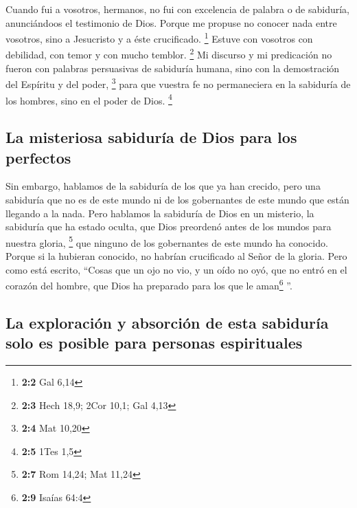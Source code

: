 \begin{paracol}{2}
 Cuando fui a vosotros, hermanos, no fui con excelencia de
palabra o de sabiduría, anunciándoos el testimonio de Dios.
 Porque me propuse no conocer nada entre vosotros, sino a
Jesucristo y a éste crucificado. \footnote{\textbf{2:2} Gal 6,14}
 Estuve con vosotros con debilidad, con temor y con mucho
temblor. \footnote{\textbf{2:3} Hech 18,9; 2Cor 10,1; Gal 4,13}
 Mi discurso y mi predicación no fueron con palabras
persuasivas de sabiduría humana, sino con la demostración del Espíritu y
del poder, \footnote{\textbf{2:4} Mat 10,20}  para que
vuestra fe no permaneciera en la sabiduría de los hombres, sino en el
poder de Dios. \footnote{\textbf{2:5} 1Tes 1,5}

\hypertarget{la-misteriosa-sabiduruxeda-de-dios-para-los-perfectos}{%
\subsection{La misteriosa sabiduría de Dios para los
perfectos}\label{la-misteriosa-sabiduruxeda-de-dios-para-los-perfectos}}

 Sin embargo, hablamos de la sabiduría de los que ya han
crecido, pero una sabiduría que no es de este mundo ni de los
gobernantes de este mundo que están llegando a la nada. 
Pero hablamos la sabiduría de Dios en un misterio, la sabiduría que ha
estado oculta, que Dios preordenó antes de los mundos para nuestra
gloria, \footnote{\textbf{2:7} Rom 14,24; Mat 11,24}  que
ninguno de los gobernantes de este mundo ha conocido. Porque si la
hubieran conocido, no habrían crucificado al Señor de la gloria.
 Pero como está escrito, ``Cosas que un ojo no vio, y un
oído no oyó, que no entró en el corazón del hombre, que Dios ha
preparado para los que le aman\footnote{\textbf{2:9} Isaías 64:4} ''.

\hypertarget{la-exploraciuxf3n-y-absorciuxf3n-de-esta-sabiduruxeda-solo-es-posible-para-personas-espirituales}{%
\subsection{La exploración y absorción de esta sabiduría solo es posible
para personas
espirituales}\label{la-exploraciuxf3n-y-absorciuxf3n-de-esta-sabiduruxeda-solo-es-posible-para-personas-espirituales}}


\end{paracol}
